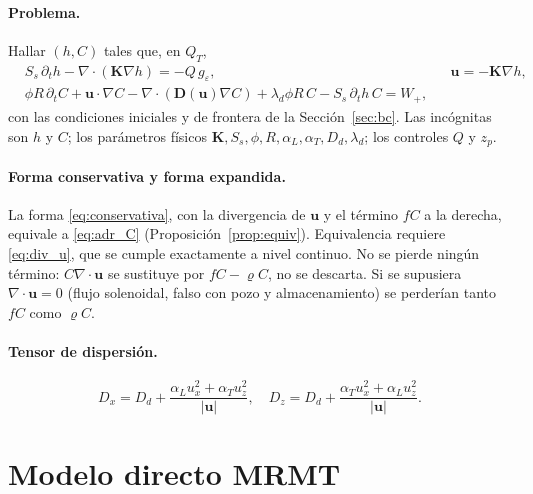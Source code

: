 \documentclass[11pt]{article}
\numberwithin{equation}{section}
\theoremstyle{remark}
\newcommand{\bu}{\mathbf{u}}
\newcommand{\bK}{\mathbf{K}}
\newcommand{\bD}{\mathbf{D}}
\newcommand{\geps}{g_\varepsilon}
\newcommand{\vr}{\varrho}              %
\begin{document}
\paragraph{Problema.} Hallar $(h,C)$ tales que, en $Q_T$,
\begin{align}
&S_s\,\partial_th-\nabla\!\cdot(\bK\nabla h)=-Q\,\geps, && \bu=-\bK\nabla h,\label{eq:adr_h}\\
&\phi R\,\partial_tC+\bu\cdot\nabla C-\nabla\!\cdot(\bD(\bu)\nabla C)+\lambda_d\phi R\,C-S_s\,\partial_th\,C=W_+,\label{eq:adr_C}
\end{align}
con las condiciones iniciales y de frontera de la Secci\'on~\ref{sec:bc}. Las incógnitas son $h$ y $C$; los parámetros físicos
$\bK,S_s,\phi,R,\alpha_L,\alpha_T,D_d,\lambda_d$; los controles $Q$ y $z_p$.

\paragraph{Forma conservativa y forma expandida.} La forma \eqref{eq:conservativa}, con la divergencia de $\bu$ y el
t\'ermino $fC$ a la derecha, equivale a \eqref{eq:adr_C} (Proposici\'on~\ref{prop:equiv}). Equivalencia requiere \eqref{eq:div_u},
que se cumple exactamente a nivel continuo. No se pierde ning\'un t\'ermino: $C\nabla\!\cdot\bu$ se sustituye por $fC-\vr C$, no se descarta.
Si se supusiera $\nabla\!\cdot\bu=0$ (flujo solenoidal, falso con pozo y almacenamiento) se perder\'ian tanto $fC$ como $\vr C$.

\paragraph{Tensor de dispersi\'on.}
\begin{equation}
D_x=D_d+\frac{\alpha_Lu_x^2+\alpha_Tu_z^2}{|\bu|},\quad D_z=D_d+\frac{\alpha_Tu_x^2+\alpha_Lu_z^2}{|\bu|}.
\label{eq:dispersion}
\end{equation}

\section{Modelo directo MRMT}
\label{sec:mrmt}
\end{document}
